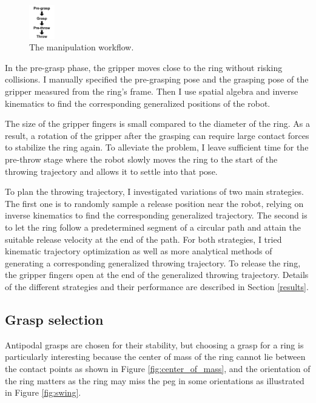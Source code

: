\documentclass[conference]{IEEEtran}
\begin{document}
\begin{figure}[ht]
\centering
\includegraphics[width=0.1\textwidth]{images/manip_steps.png}
\caption{The manipulation workflow.}
\label{fig:manip_steps}
\end{figure}

In the pre-grasp phase, the gripper moves close to the ring without risking collisions. I manually specified the pre-grasping pose and the grasping pose of the gripper measured from the ring's frame. Then I use spatial algebra and inverse kinematics to find the corresponding generalized positions of the robot.

The size of the gripper fingers is small compared to the diameter of the ring. As a result, a rotation of the gripper after the grasping can require large contact forces to stabilize the ring again. To alleviate the problem, I leave sufficient time for the pre-throw stage where the robot slowly moves the ring to the start of the throwing trajectory and allows it to settle into that pose.

To plan the throwing trajectory, I investigated variations of two main strategies. The first one is to randomly sample a release position near the robot, relying on inverse kinematics to find the corresponding generalized trajectory. The second is to let the ring follow a predetermined segment of a circular path and attain the suitable release velocity at the end of the path. For both strategies, I tried kinematic trajectory optimization as well as more analytical methods of generating a corresponding generalized throwing trajectory. To release the ring, the gripper fingers open at the end of the generalized throwing trajectory. Details of the different strategies and their performance are described in Section \ref{results}.

\subsection{Grasp selection}
Antipodal grasps are chosen for their stability, but choosing a grasp for a ring is particularly interesting because the center of mass of the ring cannot lie between the contact points as shown in Figure \ref{fig:center_of_mass}, and the orientation of the ring matters as the ring may miss the peg in some orientations as illustrated in Figure \ref{fig:swing}.
\end{document}
